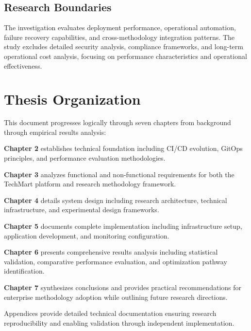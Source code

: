 \subsection{Research Boundaries}
The investigation evaluates deployment performance, operational automation, failure recovery capabilities, and cross-methodology integration patterns. The study excludes detailed security analysis, compliance frameworks, and long-term operational cost analysis, focusing on performance characteristics and operational effectiveness.

\section{Thesis Organization}

This document progresses logically through seven chapters from background through empirical results analysis:

\textbf{Chapter 2} establishes technical foundation including CI/CD evolution, GitOps principles, and performance evaluation methodologies.

\textbf{Chapter 3} analyzes functional and non-functional requirements for both the TechMart platform and research methodology framework.

\textbf{Chapter 4} details system design including research architecture, technical infrastructure, and experimental design frameworks.

\textbf{Chapter 5} documents complete implementation including infrastructure setup, application development, and monitoring configuration.

\textbf{Chapter 6} presents comprehensive results analysis including statistical validation, comparative performance evaluation, and optimization pathway identification.

\textbf{Chapter 7} synthesizes conclusions and provides practical recommendations for enterprise methodology adoption while outlining future research directions.

Appendices provide detailed technical documentation ensuring research reproducibility and enabling validation through independent implementation.